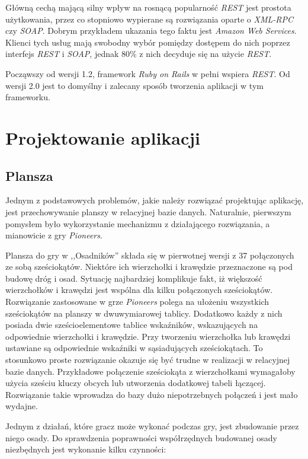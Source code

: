 \documentclass[11pt,twoside]{report}
\begin{document}
Główną cechą mającą silny wpływ na rosnącą popularność \emph{REST}
jest prostota użytkowania, przez co stopniowo wypierane są rozwiązania
oparte o \emph{XML-RPC} czy \emph{SOAP}. Dobrym przykładem ukazania
tego faktu jest \emph{Amazon Web Services}. Klienci tych usług mają
swobodny wybór pomiędzy dostępem do nich poprzez interfejs \emph{REST}
i \emph{SOAP}, jednak 80\% z nich decyduje się na użycie
\emph{REST}\cite{awsblog}.

Począwszy od wersji 1.2, framework \emph{Ruby on Rails} w pełni
wspiera \emph{REST}. Od wersji 2.0 jest to domyślny i zalecany sposób
tworzenia aplikacji w tym frameworku.

\cleardoublepage

\chapter{Projektowanie aplikacji}


\section{Plansza}\label{sec:board}
Jednym z podstawowych problemów, jakie należy rozwiązać projektując
aplikację, jest przechowywanie planszy w relacyjnej bazie
danych. Naturalnie, pierwszym pomysłem było wykorzystanie mechanizmu z
działającego rozwiązania, a mianowicie z gry \emph{Pioneers}.

Plansza do gry w ,,Osadników'' składa się w pierwotnej wersji z 37
połączonych ze sobą sześciokątów. Niektóre ich wierzchołki i krawędzie
przeznaczone są pod budowę dróg i osad. Sytuację najbardziej
komplikuje fakt, iż większość wierzchołków i krawędzi jest wspólna dla
kilku połączonych sześciokątów. Rozwiązanie zastosowane w grze
\emph{Pioneers} polega na ułożeniu wszystkich sześciokątów na planszy
w dwuwymiarowej tablicy. Dodatkowo każdy z nich posiada dwie
sześcioelementowe tablice wskaźników, wskazujących na odpowiednie
wierzchołki i krawędzie. Przy tworzeniu wierzchołka lub krawędzi
ustawiane są odpowiednie wskaźniki w sąsiadujących sześciokątach. To
stosunkowo proste rozwiązanie okazuje się być trudne w realizacji w
relacyjnej bazie danych. Przykładowe połączenie sześciokąta z
wierzchołkami wymagałoby użycia sześciu kluczy obcych lub utworzenia
dodatkowej tabeli łączącej. Rozwiązanie takie wprowadza do bazy dużo
niepotrzebnych połączeń i jest mało wydajne.

Jednym z działań, które gracz może wykonać podczas gry, jest
zbudowanie przez niego osady. Do sprawdzenia poprawności współrzędnych
budowanej osady niezbędnych jest wykonanie kilku czynności:
\end{document}
